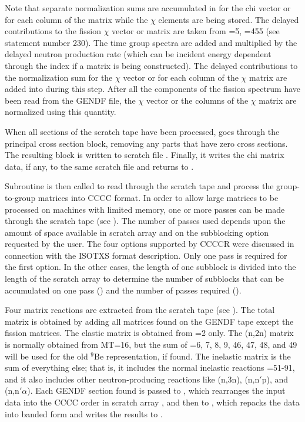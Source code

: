 \noindent
Note that separate normalization sums are accumulated in
 for the chi vector or for each column of the
matrix while the $\chi$ elements are being stored.  The delayed
contributions to the fission $\chi$ vector or matrix are taken from
=5, =455 (see statement number 230).  The
time group spectra are added and multiplied by the delayed neutron
production rate  (which can be incident energy dependent
through the  index if a matrix is being constructed).
The delayed contributions to the normalization sum for the $\chi$ vector
or for each column of the $\chi$ matrix are added into 
during this step.  After all the components of the fission spectrum
have been read from the GENDF file, the $\chi$ vector or the
columns of the $\chi$ matrix are normalized using this quantity.

When all sections of the scratch tape have been processed,
 goes through the principal cross section block,
removing any parts that have zero cross sections.  The resulting
block is written to scratch file .  Finally, it writes
the chi matrix data, if any, to the same scratch file and returns
to .

Subroutine  is then called
to read through the scratch tape and process the group-to-group
matrices into CCCC format.  In order to allow large matrices
to be processed on machines with limited memory, one
or more passes can be made through the scratch tape (see
).  The number of passes used depends upon the
amount of space available in scratch array  and on the
subblocking option requested by the user.  The four options supported
by CCCCR were discussed in connection with the ISOTXS format description.
Only one pass is required for the first option.  In the other cases, the
length of one subblock is divided into the length of the scratch array
to determine the number of subblocks that can be accumulated on one
pass () and the number of passes required ().

Four matrix reactions are extracted from the scratch tape (see
).  The total matrix is obtained by adding all
matrices found on the GENDF tape except the fission matrices.  The
elastic matrix is obtained from =2 only.  The (n,2n) matrix is
normally obtained from MT=16, but the sum of =6, 7, 8, 9, 46, 47, 48,
and 49 will be used for the old $^9$Be representation, if found.  The
inelastic matrix is the sum of everything else; that is, it includes
the normal inelastic reactions =51-91, and it also includes other
neutron-producing reactions like (n,3n), (n,n$'$p), and (n,n$'\alpha$).
Each GENDF section found is passed to , which rearranges
the input data into the CCCC order in scratch array , and
then to , which repacks the data into banded form
and writes the results to .

